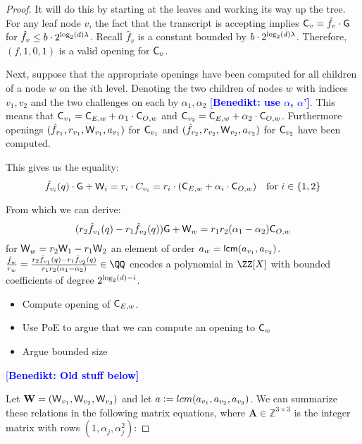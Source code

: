 \documentclass[12pt]{article}
\theoremstyle{Definition}
\newcommand{\benedikt}[1]{{\textcolor{blue}{[\bf Benedikt: #1]}}}
\begin{document}
\begin{proof}
It will do this by starting at the leaves and working its way up the tree.
For any leaf node $v$, the fact that the transcript is accepting implies $\mathsf{C}_v= \hat{f}_v \cdot \mathsf{G}$ for $\hat{f}_v \leq b \cdot 2^{\log_2(d) \lambda}$. Recall $\hat{f}_v$ is a constant bounded by $b \cdot 2^{\log_2(d) \lambda}$. Therefore, $(f,1,0,1)$ is a valid opening for $\mathsf{C}_v$.

 Next, suppose that the appropriate openings have been computed for all children of a node $w$ on the $i$th level. Denoting the two children of nodes $w$ with indices $v_1, v_2$ and the two challenges on each by $\alpha_1, \alpha_2$ \benedikt{use $\alpha$, $\alpha$'}. This means that $\mathsf{C}_{v_1} = \mathsf{C}_{E,w} + \alpha_1 \cdot \mathsf{C}_{O,w}$ and $\mathsf{C}_{v_2} = \mathsf{C}_{E,w} + \alpha_2 \cdot \mathsf{C}_{O,w}$.
Furthermore openings $(\hat{f}_{v_1},r_{v_1},\mathsf{W}_{v_1},a_{v_1})$ for $\mathsf{C}_{v_1}$ and  $(\hat{f}_{v_2},r_{v_2},\mathsf{W}_{v_2},a_{v_2})$ for $\mathsf{C}_{v_2}$ have been computed. 

This gives us the equality: 
$$\hat{f}_{v_i}(q) \cdot \mathsf{G} + \mathsf{W}_i = r_i \cdot C_{v_i} = r_i \cdot (\mathsf{C}_{E,w} + \alpha_i \cdot \mathsf{C}_{O,w}) \quad \text{for} \ i \in \{1,2\}$$

From which we can derive:
$$(r_2 \hat{f}_{v_1}(q)-r_1 \hat{f}_{v_2}(q)) \mathsf{G} + \mathsf{W}_w=r_1 r_2 (\alpha_1-\alpha_2) \mathsf{C}_{O,w}$$
for $\mathsf{W}_w= r_2 \mathsf{W}_1 - r_1 \mathsf{W}_2$ an element of order $a_w=\mathsf{lcm}(a_{v_1},a_{v_2})$.
$\frac{\hat{f}_w}{\denom_w}=\frac{\denom_2 \hat{f}_{v_1}(q)-\denom_1 \hat{f}_{v_2}(q)}{\denom_1 \denom_2 (\alpha_1-\alpha_2)} \in \QQ$ encodes a polynomial in $\ZZ[X]$ with bounded coefficients of degree $2^{\log_2(d)-i}$. 

\begin{itemize}
	\item Compute opening of $\mathsf{C}_{E,w}$. 
	\item Use PoE to argue that we can compute an opening to $\mathsf{C}_w$
	\item Argue bounded size
\end{itemize}
\benedikt{Old stuff below}

Let $\mathbf{W} = (\mathsf{W}_{v_1}, \mathsf{W}_{v_2}, \mathsf{W}_{v_3})$ and let $a \mathrel{\mathop:}= lcm(a_{v_1}, a_{v_2}, a_{v_3})$. We can summarize these relations in the following matrix equations, where $\mathbf{A} \in \mathbb{Z}^{3\times 3}$ is the integer matrix with rows $(1, \alpha_j, \alpha_j^2)$:


\end{proof}
\end{document}
